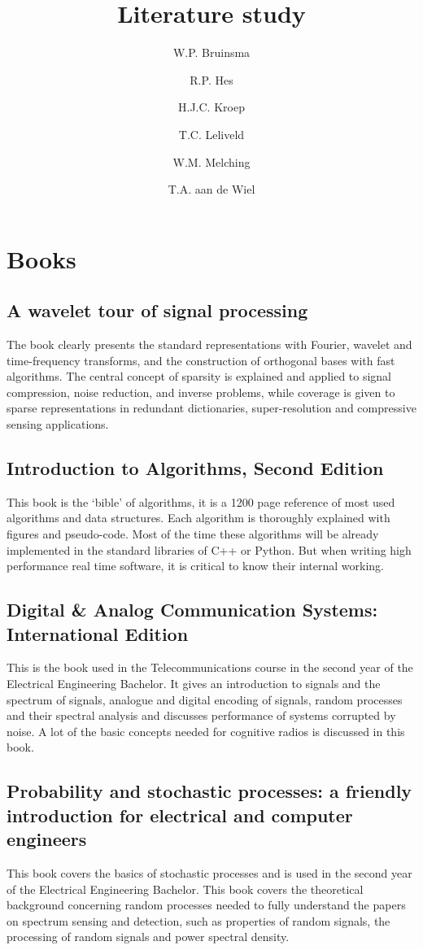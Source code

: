 \documentclass[report, oneside, a4paper, openany]{memoir}
\title{Literature study}
\author{W.P. Bruinsma \and R.P. Hes \and H.J.C. Kroep \and T.C. Leliveld \and W.M. Melching \and T.A. aan de Wiel}
\begin{document}
\chapter{Books}

\section{A wavelet tour of signal processing \cite{mallat1999wavelet}}
The book clearly presents the standard representations with Fourier, wavelet and time-frequency transforms, and the construction of orthogonal bases with fast algorithms. The central concept of sparsity is explained and applied to signal compression, noise reduction, and inverse problems, while coverage is given to sparse representations in redundant dictionaries, super-resolution and compressive sensing applications.
\section{Introduction to Algorithms, Second Edition \cite{cormen2001introduction}}
This book is the `bible' of algorithms, it is a 1200 page reference of most used algorithms and data structures. Each algorithm is thoroughly explained with figures and pseudo-code. Most of the time these algorithms will be already implemented in the standard libraries of C++ or Python. But when writing high performance real time software, it is critical to know their internal working.
\section{Digital \& Analog Communication Systems: International Edition \cite{couch2013digital}}
This is the book used in the Telecommunications course in the second year of the Electrical Engineering Bachelor. It gives an introduction to signals and the spectrum of signals, analogue and digital encoding of signals, random processes and their spectral analysis and discusses performance of systems corrupted by noise. A lot of the basic concepts needed for cognitive radios is discussed in this book. 
\section{Probability and stochastic processes: a friendly introduction for electrical and computer engineers \cite{yates2005probability}}
This book covers the basics of stochastic processes and is used in the second year of the Electrical Engineering Bachelor. This book covers the theoretical background concerning random processes needed to fully understand the papers on spectrum sensing and detection, such as properties of random signals, the processing of random signals and power spectral density.
\end{document}
